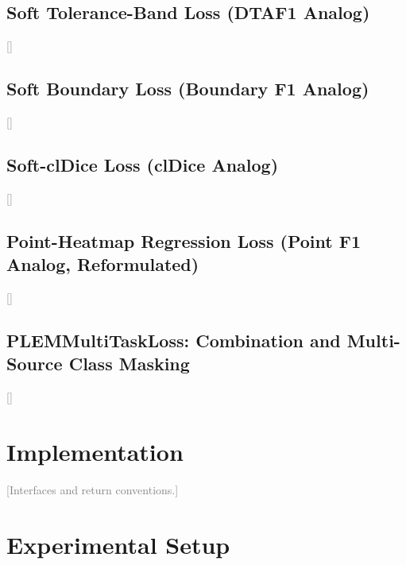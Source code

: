 \documentclass[sigconf]{acmart}
\newcommand{\tbd}[1]{\textcolor{gray}{[#1]}}
\begin{document}
\subsection{Soft Tolerance-Band Loss (DTAF1 Analog)}
\label{subsec:tolerance-loss}
\tbd{}

\subsection{Soft Boundary Loss (Boundary F1 Analog)}
\label{subsec:boundary-loss}
\tbd{}

\subsection{Soft-clDice Loss (clDice Analog)}
\label{subsec:cldice-loss}
\tbd{}

\subsection{Point-Heatmap Regression Loss (Point F1 Analog, Reformulated)}
\label{subsec:heatmap-loss}
\tbd{}

\subsection{PLEMMultiTaskLoss: Combination and Multi-Source Class Masking}
\label{subsec:multitask-loss}
\tbd{}

\section{Implementation}
\label{sec:implementation}

\tbd{Interfaces and return conventions.}

\begin{table}
  \caption{Tech stack, grouped by role.}
  \label{tab:techstack}
\end{table}

\section{Experimental Setup}
\label{sec:expsetup}
\end{document}
